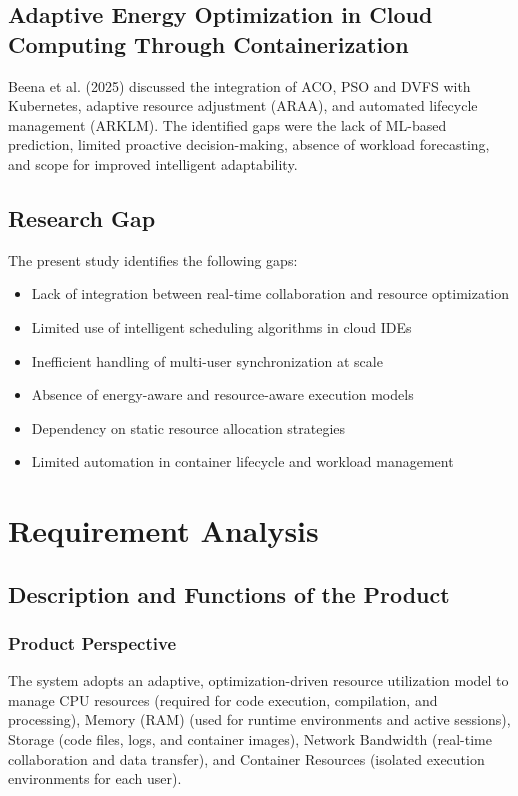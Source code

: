 \documentclass[12pt,a4paper]{report}
\begin{document}
\section{Adaptive Energy Optimization in Cloud Computing Through Containerization}
Beena et al. (2025) discussed the integration of ACO, PSO and DVFS with Kubernetes, adaptive resource adjustment (ARAA), and automated lifecycle management (ARKLM). The identified gaps were the lack of ML-based prediction, limited proactive decision-making, absence of workload forecasting, and scope for improved intelligent adaptability.

\section{Research Gap}
The present study identifies the following gaps:
\begin{itemize}
    \item Lack of integration between real-time collaboration and resource optimization
    \item Limited use of intelligent scheduling algorithms in cloud IDEs
    \item Inefficient handling of multi-user synchronization at scale
    \item Absence of energy-aware and resource-aware execution models
    \item Dependency on static resource allocation strategies
    \item Limited automation in container lifecycle and workload management
\end{itemize}

\chapter{Requirement Analysis}
\section{Description and Functions of the Product}
\subsection{Product Perspective}
The system adopts an adaptive, optimization-driven resource utilization model to manage CPU resources (required for code execution, compilation, and processing), Memory (RAM) (used for runtime environments and active sessions), Storage (code files, logs, and container images), Network Bandwidth (real-time collaboration and data transfer), and Container Resources (isolated execution environments for each user).
\end{document}
